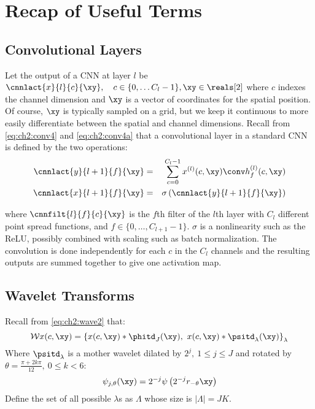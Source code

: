 \section{Recap of Useful Terms}\label{sec:ch5:background}

\subsection{Convolutional Layers}\label{sec:ch5:conv}

Let the output of a CNN at layer $l$ be 
$ \cnnlact{x}{l}{c}{\xy}, \quad c\in \{0, \ldots C_l-1\}, \xy \in \reals[2]$
where $c$ indexes the channel dimension and $\xy$ is a vector of coordinates
for the spatial position. Of course, $\xy$ is typically sampled on a grid, but
we keep it continuous to more easily differentiate between the spatial and
channel dimensions. Recall from \eqref{eq:ch2:conv4} and \eqref{eq:ch2:conv4a} that
a convolutional layer in a standard CNN is defined by the two operations:
%
\begin{eqnarray} 
  \cnnlact{y}{l+1}{f}{\xy} &=& \sum_{c=0}^{C_l - 1}  x^{(l)}(c,\xy) \conv h^{(l)}_{f}(c, \xy)
    \label{eq:ch5:conv}\\
    \cnnlact{x}{l+1}{f}{\xy} & = & \sigma \left( \cnnlact{y}{l+1}{f}{\xy} \right) \label{eq:ch5:nonlin}
\end{eqnarray}

where $\cnnfilt{l}{f}{c}{\xy}$ is the $f$th filter of the $l$th layer with $C_l$
different point spread functions, and $f \in \{0, \ldots, C_{l+1}-1 \}$. $\sigma$ is a nonlinearity 
such as the ReLU, possibly combined with scaling such as batch normalization. The convolution
is done independently for each $c$ in the $C_l$ channels and the resulting outputs are
summed together to give one activation map. 

\subsection{Wavelet Transforms}\label{sec:ch5:wavelets}
Recall from \eqref{eq:ch2:wave2} that:
\begin{equation}
  \mathcal{W}x(c, \xy) = \left\{x(c, \xy) \ast \phitd_J(\xy),\ x(c, \xy) \ast \psitd_{\lambda}(\xy) \right\}_{\lambda} \label{eq:ch5:wave2}
\end{equation}
Where $\psitd_\lambda$ is a mother wavelet dilated by $2^j,\ 1 \leq j \leq J$ and rotated by
$\theta = \frac{\pi + 2k\pi}{12},\ 0\leq k < 6$:
%
\begin{equation}
  \psi_{j, \theta}(\xy) = 2^{-j}\psi \left(2^{-j} r_{-\theta} \xy\right)
\end{equation}
Define the set of all possible $\lambda$s as $\Lambda$ whose size is $|\Lambda | = JK$.
%
